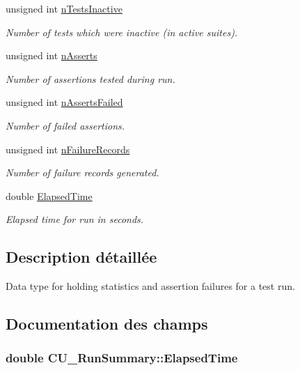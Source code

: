 \begin{DoxyCompactItemize}
unsigned int \hyperlink{structCU__RunSummary_ae6a7f6466d38db9adc3dae4b8cf89699}{n\-Tests\-Inactive}
\begin{DoxyCompactList}\small\item\em Number of tests which were inactive (in active suites). \end{DoxyCompactList}\item 
unsigned int \hyperlink{structCU__RunSummary_a90899c9309e2b4374443a7d5ab226a90}{n\-Asserts}
\begin{DoxyCompactList}\small\item\em Number of assertions tested during run. \end{DoxyCompactList}\item 
unsigned int \hyperlink{structCU__RunSummary_ad5e24306584ab2f165a435b648513b9c}{n\-Asserts\-Failed}
\begin{DoxyCompactList}\small\item\em Number of failed assertions. \end{DoxyCompactList}\item 
unsigned int \hyperlink{structCU__RunSummary_a1a2d40200bf4a3f15fd94f4f0e1faa40}{n\-Failure\-Records}
\begin{DoxyCompactList}\small\item\em Number of failure records generated. \end{DoxyCompactList}\item 
double \hyperlink{structCU__RunSummary_a92859c6c5275ddb58d1db27a485a557c}{Elapsed\-Time}
\begin{DoxyCompactList}\small\item\em Elapsed time for run in seconds. \end{DoxyCompactList}\end{DoxyCompactItemize}


\subsection{Description détaillée}
Data type for holding statistics and assertion failures for a test run. 



\subsection{Documentation des champs}
\hypertarget{structCU__RunSummary_a92859c6c5275ddb58d1db27a485a557c}{
\subsubsection[{Elapsed\-Time}]{\setlength{\rightskip}{0pt plus 5cm}double C\-U\-\_\-\-Run\-Summary\-::\-Elapsed\-Time}}\label{structCU__RunSummary_a92859c6c5275ddb58d1db27a485a557c}


